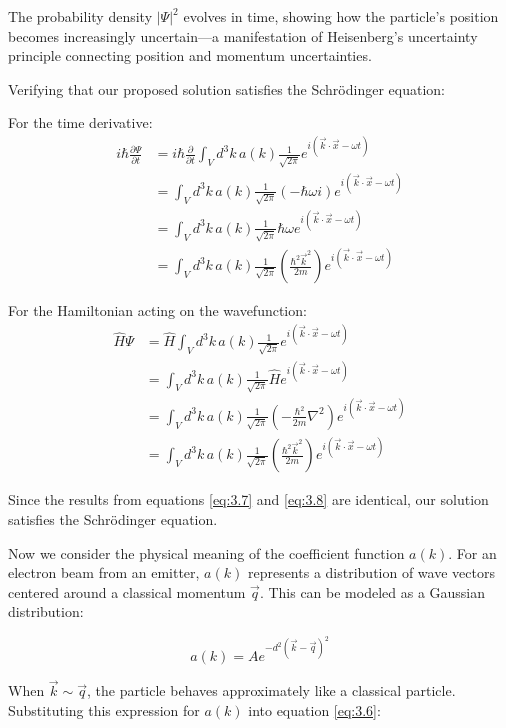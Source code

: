 The probability density $|\Psi|^2$ evolves in time, showing how the particle's position becomes increasingly uncertain—a manifestation of Heisenberg's uncertainty principle connecting position and momentum uncertainties.


Verifying that our proposed solution satisfies the Schrödinger equation:

For the time derivative:
\begin{align}
i\hbar\frac{\partial\Psi}{\partial t} &= i\hbar\frac{\partial}{\partial t}\int_V d^3k\,a(k)\frac{1}{\sqrt{2\pi}}e^{i(\vec{k}\cdot\vec{x}-\omega t)} \\
&= \int_V d^3k\,a(k)\frac{1}{\sqrt{2\pi}}(-\hbar\omega i)e^{i(\vec{k}\cdot\vec{x}-\omega t)} \\
&= \int_V d^3k\,a(k)\frac{1}{\sqrt{2\pi}}\hbar\omega e^{i(\vec{k}\cdot\vec{x}-\omega t)} \label{eq:3.7} \\
&= \int_V d^3k\,a(k)\frac{1}{\sqrt{2\pi}}\left(\frac{\hbar^2\vec{k}^2}{2m}\right)e^{i(\vec{k}\cdot\vec{x}-\omega t)}
\end{align}

For the Hamiltonian acting on the wavefunction:
\begin{align}
\hat{H}\Psi &= \hat{H}\int_V d^3k\,a(k)\frac{1}{\sqrt{2\pi}}e^{i(\vec{k}\cdot\vec{x}-\omega t)} \\
&= \int_V d^3k\,a(k)\frac{1}{\sqrt{2\pi}}\hat{H}e^{i(\vec{k}\cdot\vec{x}-\omega t)} \\
&= \int_V d^3k\,a(k)\frac{1}{\sqrt{2\pi}}\left(-\frac{\hbar^2}{2m}\nabla^2\right)e^{i(\vec{k}\cdot\vec{x}-\omega t)} \label{eq:3.8} \\
&= \int_V d^3k\,a(k)\frac{1}{\sqrt{2\pi}}\left(\frac{\hbar^2\vec{k}^2}{2m}\right)e^{i(\vec{k}\cdot\vec{x}-\omega t)}
\end{align}

Since the results from equations \eqref{eq:3.7} and \eqref{eq:3.8} are identical, our solution satisfies the Schrödinger equation.

Now we consider the physical meaning of the coefficient function $a(k)$. For an electron beam from an emitter, $a(k)$ represents a distribution of wave vectors centered around a classical momentum $\vec{q}$. This can be modeled as a Gaussian distribution:

\begin{equation}
a(k) = Ae^{-d^2(\vec{k}-\vec{q})^2}
\end{equation}

When $\vec{k} \sim \vec{q}$, the particle behaves approximately like a classical particle. Substituting this expression for $a(k)$ into equation \eqref{eq:3.6}:

